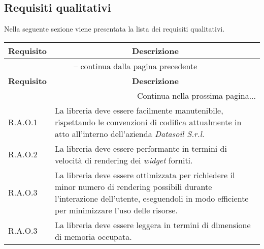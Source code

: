 \subsection{Requisiti qualitativi}
Nella seguente sezione viene presentata la lista dei requisiti qualitativi.

\begin{center}
    \begin{longtable}{|p{2.5cm}|p{10cm}|}
        \hline
        \rowcolor{gray!30}
        \textbf{Requisito} & \multicolumn{1}{c|}{\textbf{Descrizione}}                                                                                            \\
        \hline
        \endfirsthead
        \hline
        \multicolumn{2}{|c|}{{\tablename\ \thetable{} -- continua dalla pagina precedente}}                                                                       \\
        \hline
        \rowcolor{gray!30}
        \textbf{Requisito} & \multicolumn{1}{c|}{\textbf{Descrizione}}                                                                                            \\
        \endhead
        \hline
        \multicolumn{2}{|r|}{{Continua nella prossima pagina...}}                                                                                                 \\
        \hline
        \endfoot
        \hline
        \endlastfoot
        \hline
        R.A.O.1            & La libreria deve essere facilmente manutenibile, rispettando le convenzioni di codifica
        attualmente in atto all'interno dell'azienda \textit{Datasoil S.r.l.}                                                                                     \\
        \hline
        R.A.O.2            & La libreria deve essere performante in termini di velocità di rendering dei \textit{widget} forniti.                                 \\
        \hline
        R.A.O.3            & La libreria deve essere ottimizzata per richiedere il minor numero di rendering possibili durante l'interazione dell'utente,
        eseguendoli in modo efficiente per minimizzare l'uso delle risorse.                                                                                       \\
        \hline
        R.A.O.3            & La libreria deve essere leggera in termini di dimensione di memoria occupata.                                                        \\

\end{longtable}
\end{center}
